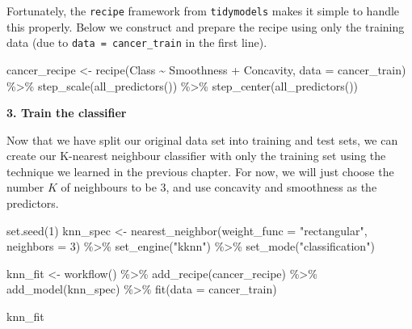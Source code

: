 \documentclass[
]{krantz}
\makeatletter
\newenvironment{Shaded}{\begin{snugshade}}{\end{snugshade}}
\newcommand{\AttributeTok}[1]{\textcolor[rgb]{0.61,0.61,0.61}{#1}}
\newcommand{\DecValTok}[1]{\textcolor[rgb]{0.06,0.06,0.06}{#1}}
\newcommand{\FunctionTok}[1]{\textcolor[rgb]{0,0,0}{#1}}
\newcommand{\NormalTok}[1]{#1}
\newcommand{\OtherTok}[1]{\textcolor[rgb]{0.37,0.37,0.37}{#1}}
\newcommand{\SpecialCharTok}[1]{\textcolor[rgb]{0,0,0}{#1}}
\newcommand{\StringTok}[1]{\textcolor[rgb]{0.5,0.5,0.5}{#1}}
\newenvironment{kframe}{%
\medskip{}
\setlength{\fboxsep}{.8em}
 \def\at@end@of@kframe{}%
 \ifinner\ifhmode%
  \def\at@end@of@kframe{\end{minipage}}%
  \begin{minipage}{\columnwidth}%
 \fi\fi%
 \def\FrameCommand##1{\hskip\@totalleftmargin \hskip-\fboxsep
 \colorbox{shadecolor}{##1}\hskip-\fboxsep
     \hskip-\linewidth \hskip-\@totalleftmargin \hskip\columnwidth}%
 \MakeFramed {\advance\hsize-\width
   \@totalleftmargin\z@ \linewidth\hsize
   \@setminipage}}%
 {\par\unskip\endMakeFramed%
 \at@end@of@kframe}
\renewenvironment{Shaded}{\begin{kframe}}{\end{kframe}}
\makeatother
\begin{document}
Fortunately, the \texttt{recipe} framework from \texttt{tidymodels} makes it simple to handle
this properly. Below we construct and prepare the recipe using only the training
data (due to \texttt{data\ =\ cancer\_train} in the first line).

\begin{Shaded}
\begin{Highlighting}[]
\NormalTok{cancer\_recipe }\OtherTok{\textless{}{-}} \FunctionTok{recipe}\NormalTok{(Class }\SpecialCharTok{\textasciitilde{}}\NormalTok{ Smoothness }\SpecialCharTok{+}\NormalTok{ Concavity, }\AttributeTok{data =}\NormalTok{ cancer\_train) }\SpecialCharTok{\%\textgreater{}\%}
  \FunctionTok{step\_scale}\NormalTok{(}\FunctionTok{all\_predictors}\NormalTok{()) }\SpecialCharTok{\%\textgreater{}\%}
  \FunctionTok{step\_center}\NormalTok{(}\FunctionTok{all\_predictors}\NormalTok{())}
\end{Highlighting}
\end{Shaded}

\textbf{3. Train the classifier}

Now that we have split our original data set into training and test sets, we
can create our K-nearest neighbour classifier with only the training set using
the technique we learned in the previous chapter. For now, we will just choose
the number \(K\) of neighbours to be 3, and use concavity and smoothness as the
predictors.

\begin{Shaded}
\begin{Highlighting}[]
\FunctionTok{set.seed}\NormalTok{(}\DecValTok{1}\NormalTok{)}
\NormalTok{knn\_spec }\OtherTok{\textless{}{-}} \FunctionTok{nearest\_neighbor}\NormalTok{(}\AttributeTok{weight\_func =} \StringTok{"rectangular"}\NormalTok{, }\AttributeTok{neighbors =} \DecValTok{3}\NormalTok{) }\SpecialCharTok{\%\textgreater{}\%}
  \FunctionTok{set\_engine}\NormalTok{(}\StringTok{"kknn"}\NormalTok{) }\SpecialCharTok{\%\textgreater{}\%}
  \FunctionTok{set\_mode}\NormalTok{(}\StringTok{"classification"}\NormalTok{)}

\NormalTok{knn\_fit }\OtherTok{\textless{}{-}} \FunctionTok{workflow}\NormalTok{() }\SpecialCharTok{\%\textgreater{}\%}
  \FunctionTok{add\_recipe}\NormalTok{(cancer\_recipe) }\SpecialCharTok{\%\textgreater{}\%}
  \FunctionTok{add\_model}\NormalTok{(knn\_spec) }\SpecialCharTok{\%\textgreater{}\%}
  \FunctionTok{fit}\NormalTok{(}\AttributeTok{data =}\NormalTok{ cancer\_train)}

\NormalTok{knn\_fit}
\end{Highlighting}
\end{Shaded}
\end{document}
